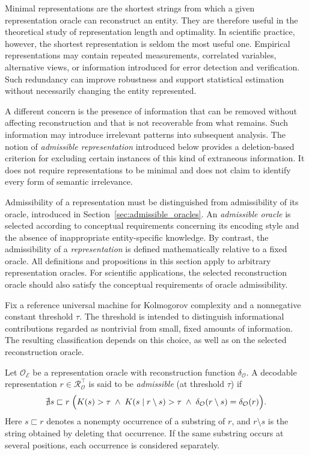 Minimal representations are the shortest strings from which a given representation oracle can reconstruct an entity. They are therefore useful in the theoretical study of representation length and optimality. In scientific practice, however, the shortest representation is seldom the most useful one. Empirical representations may contain repeated measurements, correlated variables, alternative views, or information introduced for error detection and verification. Such redundancy can improve robustness and support statistical estimation without necessarily changing the entity represented.

A different concern is the presence of information that can be removed without affecting reconstruction and that is not recoverable from what remains. Such information may introduce irrelevant patterns into subsequent analysis. The notion of \emph{admissible representation} introduced below provides a deletion-based criterion for excluding certain instances of this kind of extraneous information. It does not require representations to be minimal and does not claim to identify every form of semantic irrelevance.

Admissibility of a representation must be distinguished from admissibility of its oracle, introduced in Section~\ref{sec:admissible_oracles}. An \emph{admissible oracle} is selected according to conceptual requirements concerning its encoding style and the absence of inappropriate entity-specific knowledge. By contrast, the admissibility of a \emph{representation} is defined mathematically relative to a fixed oracle. All definitions and propositions in this section apply to arbitrary representation oracles. For scientific applications, the selected reconstruction oracle should also satisfy the conceptual requirements of oracle admissibility.

Fix a reference universal machine for Kolmogorov complexity and a nonnegative constant threshold $\tau$. The threshold is intended to distinguish informational contributions regarded as nontrivial from small, fixed amounts of information. The resulting classification depends on this choice, as well as on the selected reconstruction oracle.

\begin{definition}
\label{def:admissible_representation}
Let $\mathcal O_{\mathcal E}$ be a representation oracle with reconstruction function $\delta_{\mathcal O}$. A decodable representation $r\in\mathcal R^\top_{\mathcal O}$ is said to be \emph{admissible} (at threshold $\tau$) if
\[
\nexists s\sqsubset r\;\Bigl( K(s)>\tau \;\land\; K(s\mid r\setminus s)>\tau \;\land\;
\delta_{\mathcal O}(r\setminus s)=\delta_{\mathcal O}(r) \Bigr).
\]
Here $s\sqsubset r$ denotes a nonempty occurrence of a substring of $r$, and $r\setminus s$ is the string obtained by deleting that occurrence. If the same substring occurs at several positions, each occurrence is considered separately.
\end{definition}

